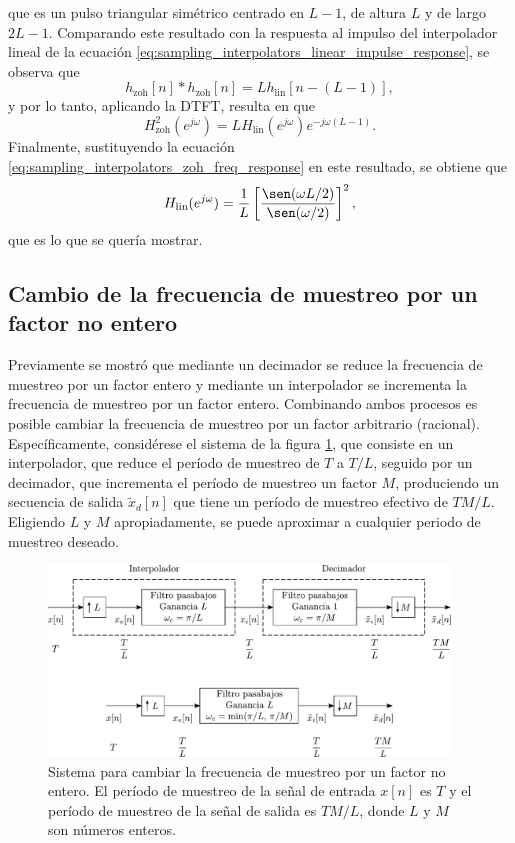 \documentclass[a4paper]{report}
\begin{document}
que es un pulso triangular simétrico centrado en \(L-1\), de altura \(L\) y de largo \(2L-1\). Comparando este resultado con la respuesta al impulso del interpolador lineal de la ecuación \ref{eq:sampling_interpolators_linear_impulse_response}, se observa que 
\[
 h_\textrm{zoh}[n]*h_\textrm{zoh}[n]=Lh_\textrm{lin}[n-(L-1)],
\]
y por lo tanto, aplicando la DTFT, resulta en que 
\[
 H^2_\textrm{zoh}(e^{j\omega})=LH_\textrm{lin}(e^{j\omega})e^{-j\omega(L-1)}.
\]
Finalmente, sustituyendo la ecuación \ref{eq:sampling_interpolators_zoh_freq_response} en este resultado, se obtiene que 
\[
 H_\textrm{lin}(e^{j\omega})=\frac{1}{L}\left[\frac{\sen(\omega L/2)}{\sen(\omega/2)}\right]^2,
\]
que es lo que se quería mostrar.

\subsection{Cambio de la frecuencia de muestreo por un factor no entero}

Previamente se mostró que mediante un decimador se reduce la frecuencia de muestreo por un factor entero y mediante un interpolador se incrementa la frecuencia de muestreo por un factor entero. Combinando ambos procesos es posible cambiar la frecuencia de muestreo por un factor arbitrario (racional). Específicamente, considérese el sistema de la figura \ref{fig:sampling_rate_change_non_integer}, que consiste en un interpolador, que reduce el período de muestreo de \(T\) a \(T/L\), seguido por un decimador, que incrementa el período de muestreo un factor \(M\), produciendo un secuencia de salida \(\tilde{x}_d[n]\) que tiene un período de muestreo efectivo de \(TM/L\). Eligiendo \(L\) y \(M\) apropiadamente, se puede aproximar a cualquier periodo de muestreo deseado.
\begin{figure}[!htb]
 \begin{center}
 \includegraphics[width=0.95\textwidth]{figuras/sampling_rate_change_non_integer.pdf}
 \caption{\label{fig:sampling_rate_change_non_integer} Sistema para cambiar la frecuencia de muestreo por un factor no entero. El período de muestreo de la señal de entrada \(x[n]\) es \(T\) y el período de muestreo de la señal de salida es \(TM/L\), donde \(L\) y \(M\) son números enteros.}
 \end{center}
\end{figure}
\end{document}
